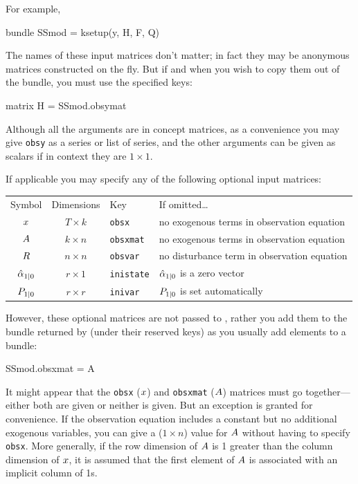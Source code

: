 \documentclass[a4paper]{article}
\begin{document}
For example,
\begin{code}
bundle SSmod = ksetup(y, H, F, Q)
\end{code} 

The names of these input matrices don't matter; in fact they may be
anonymous matrices constructed on the fly. But if and when you wish to
copy them out of the bundle, you must use the specified keys:
\begin{code}
matrix H = SSmod.obsymat
\end{code}

Although all the arguments are in concept matrices, as a convenience
you may give \texttt{obsy} as a series or list of series, and the
other arguments can be given as scalars if in context they are
$1 \times 1$.

If applicable you may specify any of the following optional input
matrices:

\begin{center}
\begin{tabular}{ccll}
Symbol & Dimensions & Key & If omitted\dots \\[6pt]
$x$ & $T \times k$ & \texttt{obsx} &
 no exogenous terms in observation equation\\
$A$ & $k \times n$ & \texttt{obsxmat} &
 no exogenous terms in observation equation\\ 
$R$ & $n \times n$ & \texttt{obsvar} & 
 no disturbance term in observation equation \\
$\hat{\alpha}_{1|0}$ & $r \times 1$ & \texttt{inistate} &
 $\hat{\alpha}_{1|0}$ is a zero vector\\
$P_{1|0}$ & $r \times r$ & \texttt{inivar} &
 $P_{1|0}$ is set automatically
\end{tabular}
\end{center}

However, these optional matrices are not passed to ,
rather you add them to the bundle returned by  (under
their reserved keys) as you usually add elements to a bundle:
\begin{code}
SSmod.obsxmat = A
\end{code}

It might appear that the \texttt{obsx} ($x$) and \texttt{obsxmat}
($A$) matrices must go together---either both are given or
neither is given.  But an exception is granted for convenience.  If
the observation equation includes a constant but no additional
exogenous variables, you can give a ($1 \times n$) value for
$A$ without having to specify \texttt{obsx}.  More generally,
if the row dimension of $A$ is 1 greater than the column
dimension of $x$, it is assumed that the first element of
$A$ is associated with an implicit column of 1s.
\end{document}
